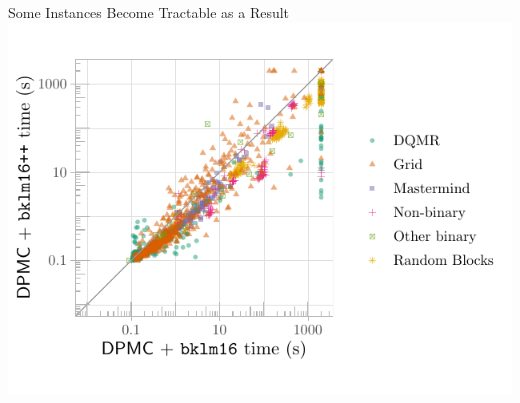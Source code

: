 \documentclass{beamer}
\begin{document}
\begin{frame}{Some Instances Become Tractable as a Result}
  \centering
  \includegraphics[width=\textwidth]{scatter2}
\end{frame}
\end{document}
